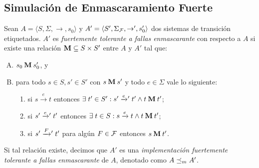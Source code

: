 \subsection{Simulación de Enmascaramiento Fuerte}
\begin{definition} \label{def:masking_rel}
  Sean $A =\langle S, \Sigma, \rightarrow, s_0\rangle$ y $A' =\langle S', \Sigma_{\mathcal{F}}, \rightarrow', s_0' \rangle$ dos sistemas de transición etiquetados.
  $A'$ es \emph{fuertemente tolerante a fallas enmascarante} con respecto a $A$ si existe una relación 
$\mathbin{\mathbf{M}} \subseteq S \times S'$ entre $A$ y $A'$ tal que:

\begin{enumerate}[(A)]
  \item $s_0 \mathbin{\mathbf{M}} s'_0$, y
  \item para todo $s \in S, s' \in S'$ con $s \mathbin{\mathbf{M}} s'$ y todo $e \in \Sigma$ vale lo siguiente:

  \begin{enumerate}[(1)]
    \item 
    si $s \xrightarrow{e} t$ entonces
    $\exists\; t' \in S': s' \mathrel{{\xrightarrow[]{e}}{}'} t'  \wedge t \mathbin{\mathbf{M}} t'$;

      \item si $s' \mathrel{{\xrightarrow[]{e}}{}'} t'$ entonces
      $\exists \; t \in S: s \xrightarrow{e} t \wedge t \mathbin{\mathbf{M}} t'$;

      \item si $s' \mathrel{{\xrightarrow[]{F}}{}'} t' $ para algún $F \in \mathcal{F}$ entonces
      $s \mathbin{\mathbf{M}} t'$.
      
  \end{enumerate}
\end{enumerate}

Si tal relación existe, decimos que $A'$ es una \emph{implementación fuertemente tolerante a fallas enmascarante} de $A$, denotado como $A \preceq_{m} A'$. 
\end{definition}


